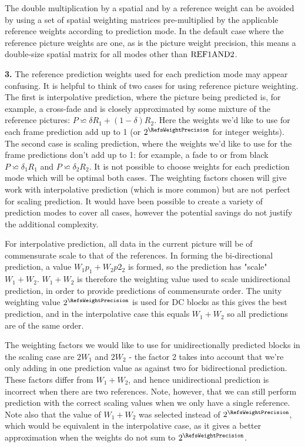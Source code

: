 \begin{informative}
The double multiplication by a spatial and by a reference weight can be avoided by using a set of spatial weighting matrices
pre-multiplied by the applicable reference weights according to prediction mode. In the default case where the reference
picture weights are one, as is the picture weight precision, this means a double-size spatial matrix for all modes other than
$\text{REF1AND2}$.

{\bf 3.} The reference prediction weights used for each prediction mode may appear confusing. It is helpful
to think of two cases for using reference picture weighting. The first is interpolative 
prediction, where the picture being predicted is, for example, a cross-fade and is
closely approximated by some mixture of the reference pictures:
 $P\backsimeq\delta R_1+(1-\delta)R_2$. Here the weights we'd like to
use for each frame prediction add up to 1 (or $2^\RefsWeightPrecision$ for integer weights). 
The second case is scaling prediction, where 
the weights we'd like to use for the frame predictions don't add up to 1: for example,
a fade to or from black
$P\backsimeq\delta_1 R_1$ and $P\backsimeq\delta_2 R_2$. It is not possible to choose 
weights for each prediction mode which will be optimal both cases. The weighting
factors chosen will give work with interpolative prediction (which is more common) 
but are not perfect for scaling prediction. It would have been possible to create a variety of
prediction modes to cover all cases, however the potential savings do not justify the
additional complexity.

For interpolative prediction, all data in the current picture will be of commensurate scale to
that of the references. In forming the bi-directional prediction, a value $W_1 p_1 + W_2 p2_2$ is 
formed, so the prediction has "scale" $W_1+W_2$. $W_1+W_2$ is 
therefore the weighting value used to scale unidirectional prediction, in order to provide
predictions of commensurate order. The unity weighting value $2^\RefsWeightPrecision$ is used
for DC blocks as this gives the best prediction, and in the interpolative case this equals $W_1+W_2$
so all predictions are of the same order.

The weighting factors we would like to use for unidirectionally predicted blocks in the scaling case
are $2W_1$ and $2W_2$ - the factor 2 takes into account that we're only adding in one prediction
value as against two for bidirectional prediction. These factors differ from $W_1+W_2$, and hence
unidirectional prediction is incorrect when there are two references. Note, however, that we can
still perform prediction with the correct scaling values when we only have a single reference. Note
also that the value of $W_1+W_2$ was selected instead of $2^\RefsWeightPrecision$, which
would be equivalent in the interpolative case, as it gives a better approximation when the
weights do not sum to $2^\RefsWeightPrecision$.
\end{informative}


